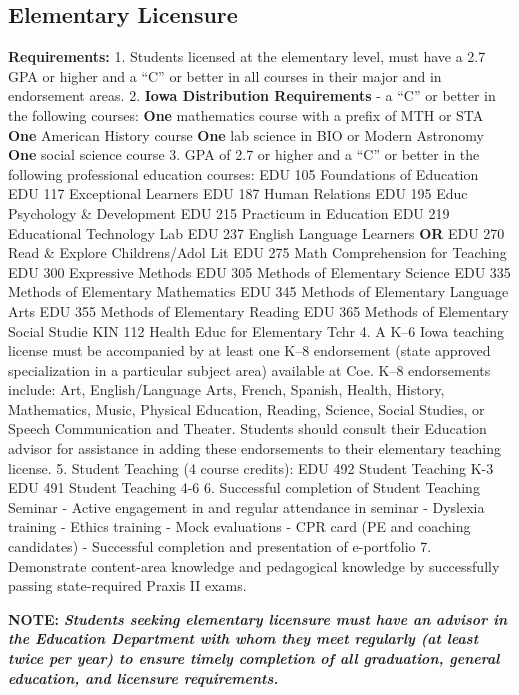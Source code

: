 \documentclass[
  letterpaper,
]{scrbook}
\begin{document}
\subsection{Elementary Licensure}\label{elementary-licensure}

\textbf{Requirements:} 1. Students licensed at the elementary level,
must have a 2.7 GPA or higher and a ``C'' or better in all courses in
their major and in endorsement areas. 2. \textbf{Iowa Distribution
Requirements} - a ``C'' or better in the following courses: \textbf{One}
mathematics course with a prefix of MTH or STA \textbf{One} American
History course \textbf{One} lab science in BIO or Modern Astronomy
\textbf{One} social science course 3. GPA of 2.7 or higher and a ``C''
or better in the following professional education courses: EDU 105
Foundations of Education EDU 117 Exceptional Learners EDU 187 Human
Relations EDU 195 Educ Psychology \& Development EDU 215 Practicum in
Education EDU 219 Educational Technology Lab EDU 237 English Language
Learners \textbf{OR} EDU 270 Read \& Explore Childrens/Adol Lit EDU 275
Math Comprehension for Teaching EDU 300 Expressive Methods EDU 305
Methods of Elementary Science EDU 335 Methods of Elementary Mathematics
EDU 345 Methods of Elementary Language Arts EDU 355 Methods of
Elementary Reading EDU 365 Methods of Elementary Social Studie KIN 112
Health Educ for Elementary Tchr 4. A K--6 Iowa teaching license must be
accompanied by at least one K--8 endorsement (state approved
specialization in a particular subject area) available at Coe. K--8
endorsements include: Art, English/Language Arts, French, Spanish,
Health, History, Mathematics, Music, Physical Education, Reading,
Science, Social Studies, or Speech Communication and Theater. Students
should consult their Education advisor for assistance in adding these
endorsements to their elementary teaching license. 5. Student Teaching
(4 course credits): EDU 492 Student Teaching K-3 EDU 491 Student
Teaching 4-6 6. Successful completion of Student Teaching Seminar -
Active engagement in and regular attendance in seminar - Dyslexia
training - Ethics training - Mock evaluations - CPR card (PE and
coaching candidates) - Successful completion and presentation of
e-portfolio 7. Demonstrate content-area knowledge and pedagogical
knowledge by successfully passing state-required Praxis II exams.

\textbf{NOTE:} \textbf{\emph{Students seeking elementary licensure must
have an advisor in the Education Department with whom they meet
regularly (at least twice per year) to ensure timely completion of all
graduation, general education, and licensure requirements.}}
\end{document}

